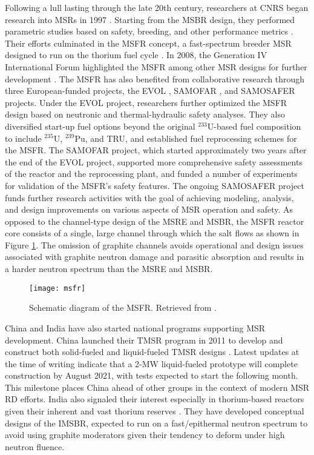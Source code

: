 Following a lull lasting through the late 20th century, researchers at
\gls{CNRS} began research into \glspl{MSR} in 1997
\cite{heuer_simulation_2010}. Starting from the \gls{MSBR} design, they
performed parametric studies based on safety, breeding, and
other performance metrics \cite{mathieu_thorium_2006}. Their efforts
culminated in the \gls{MSFR} concept, a fast-spectrum breeder \gls{MSR}
designed to run on the thorium fuel cycle \cite{merle_optimized_2007}. In
2008, the Generation IV International Forum highlighted the \gls{MSFR} among
other \gls{MSR} designs for further development \cite{gif_generation_2008}.
The \gls{MSFR} has also benefited from collaborative research through three
European-funded projects, the \gls{EVOL} \cite{euratom_final_2015},
\gls{SAMOFAR} \cite{kloosterman_20_2017}, and \gls{SAMOSAFER}
\cite{cordis_severe_nodate} projects. Under the \gls{EVOL}
project, researchers further optimized the \gls{MSFR} design based on
neutronic and thermal-hydraulic safety analyses. They also diversified
start-up fuel options beyond the original $^{233}$U-based fuel composition to
include $^{235}$U, $^{239}$Pu, and \gls{TRU}, and established fuel
reprocessing schemes for the \gls{MSFR}. The \gls{SAMOFAR} project, which
started approximately two years after the end of the \gls{EVOL} project,
supported more comprehensive safety assessments of the reactor and the
reprocessing plant, and funded a number of experiments for validation of the
\gls{MSFR}'s safety features. The ongoing \gls{SAMOSAFER} project funds further
research activities with the goal of achieving modeling, analysis, and
design improvements on various aspects of \gls{MSR} operation and safety. As
opposed to the channel-type design of the \gls{MSRE} and \gls{MSBR}, the
\gls{MSFR} reactor core consists of a single, large channel through which the
salt flows as shown in Figure \ref{fig:msfr}. The omission of graphite channels
avoids operational and design issues associated with graphite neutron damage
and parasitic absorption and results in
a harder neutron spectrum than the \gls{MSRE} and \gls{MSBR}.
%
\begin{figure}[htb!]
	\centering
	\texttt{[image: msfr]}
	\caption{Schematic diagram of the \gls{MSFR}. Retrieved from 
	\cite{allibert_7_2016}.}
	\label{fig:msfr}
\end{figure}

China and India have also started national programs supporting \gls{MSR}
development. China launched their \gls{TMSR} program in 2011 to develop and
construct both solid-fueled and liquid-fueled \gls{TMSR} designs
\cite{zou_research_2019}. Latest updates at the time of writing indicate that a
2-MW liquid-fueled prototype will complete construction by August
2021, with tests expected to start the following month. This milestone places
China ahead of other groups in the context of modern \gls{MSR} \gls{RD}
efforts. India also signaled their interest especially in thorium-based
reactors given their inherent and vast thorium reserves
\cite{jayaram_overview_1987}. They have developed conceptual designs of the
\gls{IMSBR}, expected to run on a fast/epithermal neutron spectrum to avoid
using graphite moderators given their tendency to deform under high neutron
fluence.

